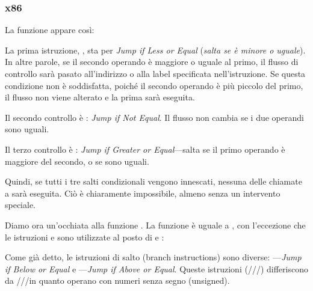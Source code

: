 \subsubsection{x86}


La funzione  appare così:




La prima istruzione, \JLE, sta per \emph{Jump if Less or Equal} (\emph{salta se è minore o uguale}). 
In altre parole, se il secondo operando è
maggiore o uguale al primo, il flusso di controllo sarà pasato all'indirizzo o alla label specificata nell'istruzione. 
Se questa condizione non è soddisfatta, poiché il secondo operando è più piccolo del primo, il flusso non viene alterato e la prima \printf sarà eseguita.

Il secondo controllo è \JNE: \emph{Jump if Not Equal}.
Il flusso non cambia se i due operandi sono uguali.

Il terzo controllo è \JGE: \emph{Jump if Greater or Equal}---salta se il primo operando è maggiore del secondo, o se sono uguali.

Quindi, se tutti i tre salti condizionali vengono innescati, nessuna delle chiamate a \printf sarà eseguita.
Ciò è chiaramente impossibile, almeno senza un intervento speciale.

Diamo ora un'occhiata alla funzione .
La funzione  è uguale a , con l'eccezione che le istruzioni \JBE e \JAE
sono utilizzate al posto di \JLE e \JGE:




Come già detto, le istruzioni di salto (branch instructions) sono diverse:
\JBE---\emph{Jump if Below or Equal} e \JAE---\emph{Jump if Above or Equal}.
Queste istruzioni (\JA/\JAE/\JB/\JBE) differiscono da \JG/\JGE/\JL/\JLE in quanto operano con numeri senza segno (unsigned).


